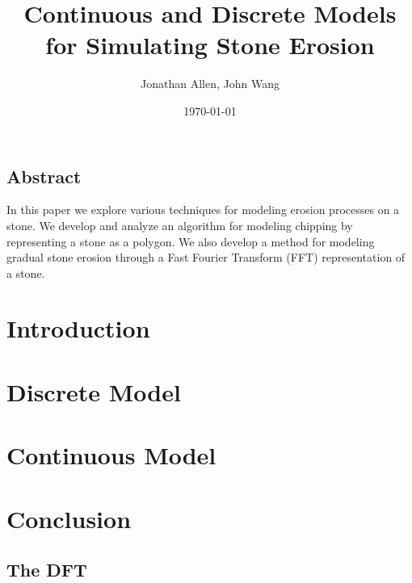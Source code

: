 \documentclass[12pt]{amsart}   %
\begin{document}
\graphicspath{ {figures/} }

\title[Shape of Stones]{Continuous and Discrete Models for Simulating Stone Erosion}
 
\author{Jonathan Allen, John Wang}
\date{\today}

\maketitle

\subsection*{Abstract}

In this paper we explore various techniques for modeling erosion processes on a stone. We develop and analyze an algorithm for modeling chipping by representing a stone as a polygon. We also develop a method for modeling gradual stone erosion through a Fast Fourier Transform (FFT) representation of a stone.

\section{Introduction}


\section{Discrete Model}


\section{Continuous Model}


\section{Conclusion}


\begin{appendix}

\section{The DFT}\label{sec:dft}


\end{appendix}


\end{document}
